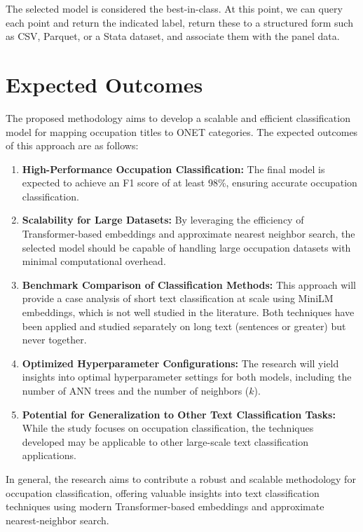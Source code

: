 \documentclass[12pt]{article}
\begin{document}
The selected model is considered the best-in-class. At this point, we can query each point and return the indicated label, return these to a structured form such as CSV, Parquet, or a Stata dataset, and associate them with the panel data. 


\section{Expected Outcomes}\label{sec:outcomes}

The proposed methodology aims to develop a scalable and efficient classification model for mapping occupation titles to ONET categories. The expected outcomes of this approach are as follows:

\begin{enumerate}
    \item \textbf{High-Performance Occupation Classification:} 
    The final model is expected to achieve an F1 score of at least 98\%, ensuring accurate occupation classification.

    \item \textbf{Scalability for Large Datasets:} 
    By leveraging the efficiency of Transformer-based embeddings and approximate nearest neighbor search, the selected model should be capable of handling large occupation datasets with minimal computational overhead.

    \item \textbf{Benchmark Comparison of Classification Methods:} 
    This approach will provide a case analysis of short text classification at scale using MiniLM embeddings, which is not well studied in the literature. Both techniques have been applied and studied separately on long text (sentences or greater) but never together.  

    \item \textbf{Optimized Hyperparameter Configurations:} 
    The research will yield insights into optimal hyperparameter settings for both models, including the number of ANN trees and the number of neighbors (\(k\)).

    \item \textbf{Potential for Generalization to Other Text Classification Tasks:} 
    While the study focuses on occupation classification, the techniques developed may be applicable to other large-scale text classification applications.

\end{enumerate}

In general, the research aims to contribute a robust and scalable methodology for occupation classification, offering valuable insights into text classification techniques using modern Transformer-based embeddings and approximate nearest-neighbor search.
\end{document}
